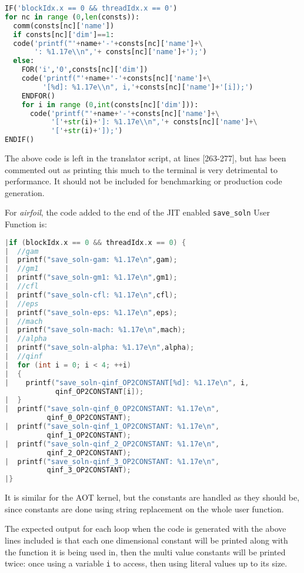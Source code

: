 \begin{lstlisting}[backgroundcolor=\color{lightgray!20}, language=Python]
IF('blockIdx.x == 0 && threadIdx.x == 0')
for nc in range (0,len(consts)):
  comm(consts[nc]['name'])
  if consts[nc]['dim']==1:
  code('printf("'+name+'-'+consts[nc]['name']+\
       ': %1.17e\\n",'+ consts[nc]['name']+');')
  else:
    FOR('i','0',consts[nc]['dim'])
    code('printf("'+name+'-'+consts[nc]['name']+\
         '[%d]: %1.17e\\n", i,'+consts[nc]['name']+'[i]);')
    ENDFOR()
    for i in range (0,int(consts[nc]['dim'])):
      code('printf("'+name+'-'+consts[nc]['name']+\
           '['+str(i)+']: %1.17e\\n",'+ consts[nc]['name']+\
           '['+str(i)+']);')
ENDIF()
\end{lstlisting}
The above code is left in the translator script, at lines [263-277], but has been commented out as printing this much to the terminal is very detrimental to performance. It should not be included for benchmarking or production code generation.
\par
For \textit{airfoil}, the code added to the end of the JIT enabled \verb|save_soln| User Function is:
\begin{lstlisting}[backgroundcolor=\color{red!20},language=C]
|if (blockIdx.x == 0 && threadIdx.x == 0) {
|  //gam
|  printf("save_soln-gam: %1.17e\n",gam);
|  //gm1
|  printf("save_soln-gm1: %1.17e\n",gm1);
|  //cfl
|  printf("save_soln-cfl: %1.17e\n",cfl);
|  //eps
|  printf("save_soln-eps: %1.17e\n",eps);
|  //mach
|  printf("save_soln-mach: %1.17e\n",mach);
|  //alpha
|  printf("save_soln-alpha: %1.17e\n",alpha);
|  //qinf
|  for (int i = 0; i < 4; ++i)
|  {
|    printf("save_soln-qinf_OP2CONSTANT[%d]: %1.17e\n", i,
            qinf_OP2CONSTANT[i]);
|  }
|  printf("save_soln-qinf_0_OP2CONSTANT: %1.17e\n",
          qinf_0_OP2CONSTANT);
|  printf("save_soln-qinf_1_OP2CONSTANT: %1.17e\n",
          qinf_1_OP2CONSTANT);
|  printf("save_soln-qinf_2_OP2CONSTANT: %1.17e\n",
          qinf_2_OP2CONSTANT);
|  printf("save_soln-qinf_3_OP2CONSTANT: %1.17e\n",
          qinf_3_OP2CONSTANT);
|}
\end{lstlisting}
It is similar for the AOT kernel, but the constants are handled as they should be, since constants are done using string replacement on the whole user function.\par
The expected output for each loop when the code is generated with the above lines included is that each one dimensional constant will be printed along with the function it is being used in, then the multi value constants will be printed twice: once using a variable \verb|i| to access, then using literal values up to its size.
